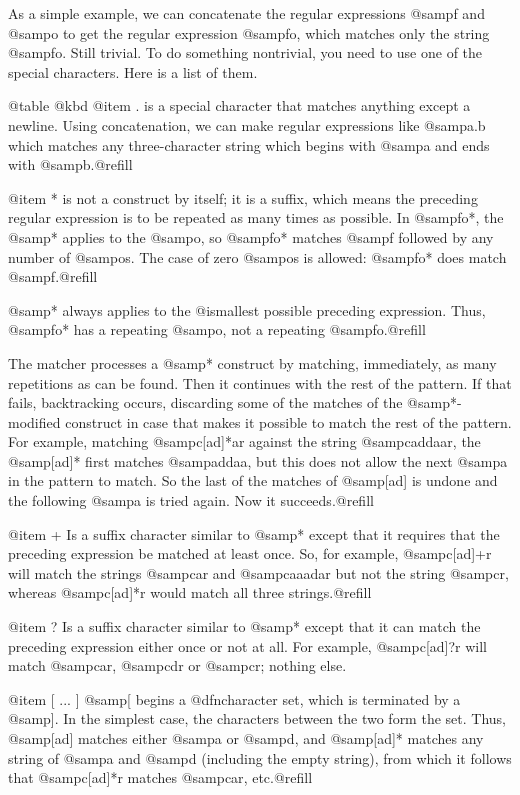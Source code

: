 {{{{{{{{{{As a simple example, we can concatenate the regular expressions @samp{f}
and @samp{o} to get the regular expression @samp{fo}, which matches only
the string @samp{fo}.  Still trivial.  To do something nontrivial, you
need to use one of the special characters.  Here is a list of them.

@table @kbd
@item .
is a special character that matches anything except a newline.  Using
concatenation, we can make regular expressions like @samp{a.b} which
matches any three-character string which begins with @samp{a} and ends
with @samp{b}.@refill

@item *
is not a construct by itself; it is a suffix, which means the
preceding regular expression is to be repeated as many times as
possible.  In @samp{fo*}, the @samp{*} applies to the @samp{o}, so
@samp{fo*} matches @samp{f} followed by any number of @samp{o}s.  The
case of zero @samp{o}s is allowed: @samp{fo*} does match @samp{f}.@refill

@samp{*} always applies to the @i{smallest} possible preceding expression.
Thus, @samp{fo*} has a repeating @samp{o}, not a repeating @samp{fo}.@refill

The matcher processes a @samp{*} construct by matching, immediately,
as many repetitions as can be found.  Then it continues with the rest
of the pattern.  If that fails, backtracking occurs, discarding some
of the matches of the @samp{*}-modified construct in case that makes
it possible to match the rest of the pattern.  For example, matching
@samp{c[ad]*ar} against the string @samp{caddaar}, the @samp{[ad]*}
first matches @samp{addaa}, but this does not allow the next @samp{a}
in the pattern to match.  So the last of the matches of @samp{[ad]} is
undone and the following @samp{a} is tried again.  Now it
succeeds.@refill

@item +
Is a suffix character similar to @samp{*} except that it requires that
the preceding expression be matched at least once.  So, for example,
@samp{c[ad]+r} will match the strings @samp{car} and @samp{caaadar}
but not the string @samp{cr}, whereas @samp{c[ad]*r} would match all
three strings.@refill

@item ?
Is a suffix character similar to @samp{*} except that it can match the
preceding expression either once or not at all.  For example,
@samp{c[ad]?r} will match @samp{car}, @samp{cdr} or @samp{cr}; nothing else.

@item [ ... ]
@samp{[} begins a @dfn{character set}, which is terminated by a
@samp{]}.  In the simplest case, the characters between the two form
the set.  Thus, @samp{[ad]} matches either @samp{a} or @samp{d}, and
@samp{[ad]*} matches any string of @samp{a} and @samp{d} (including
the empty string), from which it follows that @samp{c[ad]*r} matches
@samp{car}, etc.@refill

}}}}}}}}}}
